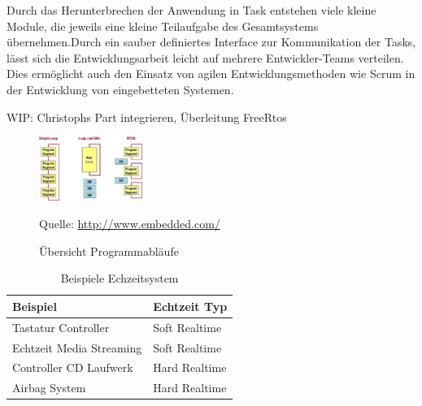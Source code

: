 \documentclass[ngerman]{seminarvorlage}
\newcommand*{\quelle}{%
  \footnotesize Quelle: 
}
\begin{document}
Durch das Herunterbrechen der Anwendung in Task entstehen viele kleine Module, die jeweils eine kleine Teilaufgabe des Gesamtsystems übernehmen.Durch ein sauber definiertes Interface zur Kommunikation der Tasks, lässt sich die Entwicklungsarbeit leicht auf mehrere Entwickler-Teams verteilen. Dies ermöglicht auch den Einsatz von agilen Entwicklungsmethoden wie Scrum in der Entwicklung von eingebetteten Systemen. 

WIP: Christophs Part integrieren, Überleitung FreeRtos  
\newline  
\begin{figure}
	\centering
		\includegraphics[width=0.3\textwidth]{Pictures/EmbeddedCom/cwrtos2f5c.jpg}
	\caption{Übersicht Programmabläufe}
	\quelle\url{http://www.embedded.com/}
	\label{fig:Programmablauf}
\end{figure}

\begin{table}
	\centering
		\begin{tabular}{|l|l|}
		\hline
			   Beispiel & Echtzeit Typ \\
				\hline
  Tastatur Controller & Soft Realtime \\
	\hline
  Echtzeit Media Streaming  & Soft Realtime \\
	\hline
	Controller CD Laufwerk  & Hard Realtime \\
	\hline
	Airbag System  & Hard Realtime\\
	\hline
		\end{tabular}
	\caption{Beispiele Echzeitsystem}
	\label{tab:BeispieleEchzeitsystem}
\end{table}




\end{document}
